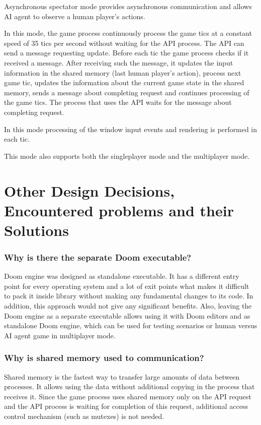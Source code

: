 \documentclass[english,bachelor,a4paper,twoside]{ppfcmthesis}
\begin{document}
	    Asynchronous spectator mode provides asynchronous communication and allows AI agent to observe a human player's actions. 
	    
	    In this mode, the game process continuously process the game tics at a constant speed of 35 tics per second without waiting for the API process. The API can send a message requesting update. Before each tic the game process checks if it received a message. After receiving such the message, it updates the input information in the shared memory (last human player's action), process next game tic, updates the information about the current game state in the shared memory, sends a message about completing request and continues processing of the game tics. The process that uses the API waits for the message about completing request.

        In this mode processing of the window input events and rendering is performed in each tic.
        
        This mode also supports both the singleplayer mode and the multiplayer mode.

\section{Other Design Decisions, Encountered problems and their Solutions}\label{sec:architecture_solutions}

\subsubsection{Why is there the separate Doom executable?}

Doom engine was designed as standalone executable. It has a different entry point for every operating system and a lot of exit points what makes it difficult to pack it inside library without making any fundamental changes to its code. In addition, this approach would not give any significant benefits. Also, leaving the Doom engine as a separate executable allows using it with Doom editors and as standalone Doom engine, which can be used for testing scenarios or human versus AI agent game in multiplayer mode.

\subsubsection{Why is shared memory used to communication?}

Shared memory is the fastest way to transfer large amounts of data between processes. It allows using the data without additional copying in the process that receives it. 
Since the game process uses shared memory only on the API request and the API process is waiting for completion of this request, additional access control mechanism (such as mutexes) is not needed.
\end{document}
